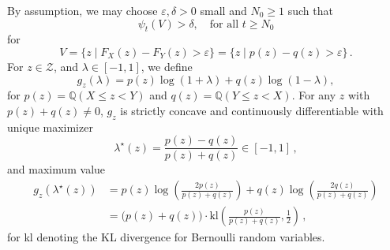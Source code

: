 \documentclass[12pt,twoside]{article}
\theoremstyle{plain}
\theoremstyle{definition}
\theoremstyle{remark}
\newcommand{\calZ}{\mathcal{Z}}
\newcommand{\Qsymb}{\mathbb{Q}}
\renewcommand{\epsilon}{\varepsilon}
\begin{document}
    By assumption, we may choose $\epsilon,\delta>0$ small and $N_0\geq 1$ such that 
    \begin{equation*}
        \psi_t(V)>\delta, \quad \textrm{for all }t\geq N_0
    \end{equation*}
    for
    \begin{equation*}
        V=\{z \mid F_X(z)-F_Y(z) > \epsilon\}= \{z \mid p(z)-q(z) > \epsilon\}\,.
    \end{equation*}
    For $z\in \calZ$, and $\lambda \in [-1,1]$, we define
  \begin{equation*}
      g_z(\lambda)=p(z) \log(1+\lambda) + q(z) \log(1-\lambda),  
  \end{equation*}
  for $ p(z) = \Qsymb(X\leq z < Y)$ and $ q(z) = \Qsymb(Y\leq z < X).$ 
  For any $z$ with $p(z)+ q(z)\neq 0$, $g_z$ is strictly concave and continuously differentiable with unique maximizer
\begin{equation*}
    \lambda^\star(z) = \frac{p(z)-q(z)}{p(z)+q(z)}\in [-1,1]\,,
\end{equation*}
and maximum value
\begin{align}
     g_z(\lambda^\star(z)) &= p(z) \log\left(\frac{2 p(z)}{p(z)+q(z)}\right)+q(z)\log\left(\frac{2 q(z)}{p(z)+q(z)}\right)\nonumber\\ &=\big(p(z)+q(z)\big)\cdot\textrm{kl}\left(\frac{p(z)}{p(z)+q(z)},\frac{1}{2}\right)\,,\label{eq_kl}
\end{align}
for kl denoting the KL divergence for Bernoulli random variables.
\end{document}
